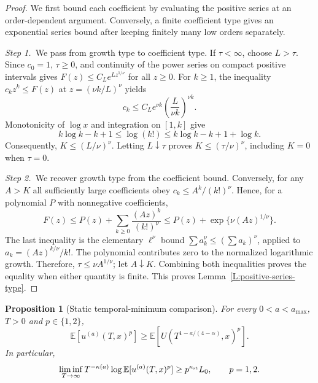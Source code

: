 \documentclass[12pt,oneside,openany]{book}
\numberwithin{equation}{section}
\newtheorem{proposition}[theorem]{Proposition}
\theoremstyle{nogostyle}
\theoremstyle{definition}
\newcommand{\E}{\mathbb{E}}
\begin{document}
\begin{proof}
  We first bound each coefficient by evaluating the positive series at an
  order-dependent argument. Conversely, a finite coefficient type gives an
  exponential series bound after keeping finitely many low orders separately.


  \medskip
  \noindent\textit{Step 1.~}We pass from growth type to coefficient type.
  If $\tau < \infty$, choose $L > \tau$. Since $c_0 = 1$, $\tau \ge 0$, and
  continuity of the power series on compact positive intervals gives $F(z) \le
  C_L e^{Lz^{1/\nu}}$ for all $z \ge 0$. For $k \ge 1$, the inequality $c_kz^k
  \le F(z)$ at $z = (\nu k/L)^\nu$ yields
  \[
    c_k\le C_L e^{\nu k}\left(\frac L{\nu k}\right)^{\nu k}.
  \]
  Monotonicity of $\log x$ and integration on $[1,k]$ give
  \[
    k\log k-k+1\le\log(k!)
    \le k\log k-k+1+\log k.
  \]
  Consequently, $K \le (L/\nu)^\nu$. Letting $L\downarrow\tau$ proves $K \le
  (\tau/\nu)^\nu$, including $K = 0$ when $\tau = 0$.


  \medskip
  \noindent\textit{Step 2.~}We recover growth type from the coefficient bound.
  Conversely, for any $A > K$ all sufficiently large coefficients obey $c_k \le
  A^k/(k!)^\nu$. Hence, for a polynomial $P$ with nonnegative coefficients,
  \[
    F(z)\le P(z)+\sum_{k\ge0}\frac{(Az)^k}{(k!)^\nu}
    \le P(z)+\exp\{\nu(Az)^{1/\nu}\}.
  \]
  The last inequality is the elementary $\ell^\nu$ bound $\sum a_k^\nu \le (\sum
  a_k)^\nu$, applied to $a_k = (Az)^{k/\nu}/k!$. The polynomial contributes zero
  to the normalized logarithmic growth. Therefore, $\tau \le \nu A^{1/\nu}$; let
  $A\downarrow K$. Combining both inequalities proves the equality when either
  quantity is finite. This proves Lemma~\ref{L:positive-series-type}.
\end{proof}

\begin{proposition}[Static temporal-minimum comparison]\label{P:static-minorant-lower}
  For every $0 < a < a_{\max}$, $T > 0$ and $p \in \{1,2\}$,
  \begin{equation}\label{E:static-minorant-moment}
    \E[u^{(a)}(T,x)^p]
    \ge\E\left[U\left(T^{1-a/(4-\alpha)},x\right)^p\right].
  \end{equation}
  In particular,
  \begin{equation}\label{E:static-minorant-rate}
    \liminf_{T\to\infty}T^{-\kappa(a)}\log\E[u^{(a)}(T,x)^p]
    \ge p^{\kappa_{\rm st}}L_0,\qquad p=1,2.
  \end{equation}
\end{proposition}
\end{document}

